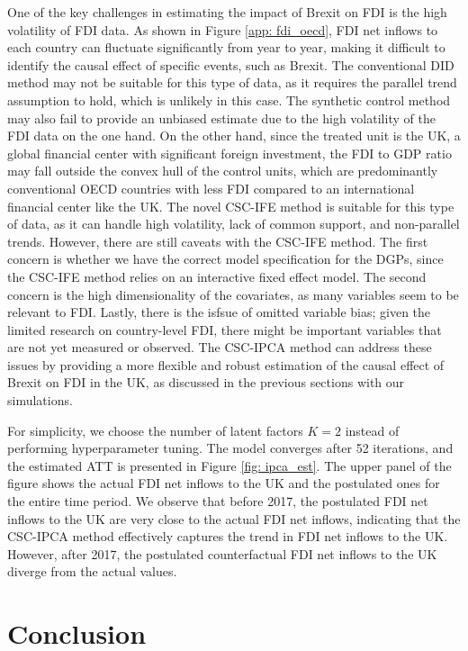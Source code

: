 \documentclass[12pt]{article}
\begin{document}
One of the key challenges in estimating the impact of Brexit on FDI is the high volatility of FDI data. As shown in Figure \ref{app: fdi_oecd}, FDI net inflows to each country can fluctuate significantly from year to year, making it difficult to identify the causal effect of specific events, such as Brexit. The conventional DID method may not be suitable for this type of data, as it requires the parallel trend assumption to hold, which is unlikely in this case. The synthetic control method may also fail to provide an unbiased estimate due to the high volatility of the FDI data on the one hand. On the other hand, since the treated unit is the UK, a global financial center with significant foreign investment, the FDI to GDP ratio may fall outside the convex hull of the control units, which are predominantly conventional OECD countries with less FDI compared to an international financial center like the UK. The novel CSC-IFE method is suitable for this type of data, as it can handle high volatility, lack of common support, and non-parallel trends. However, there are still caveats with the CSC-IFE method. The first concern is whether we have the correct model specification for the DGPs, since the CSC-IFE method relies on an interactive fixed effect model. The second concern is the high dimensionality of the covariates, as many variables seem to be relevant to FDI. Lastly, there is the isfsue of omitted variable bias; given the limited research on country-level FDI, there might be important variables that are not yet measured or observed. The CSC-IPCA method can address these issues by providing a more flexible and robust estimation of the causal effect of Brexit on FDI in the UK, as discussed in the previous sections with our simulations.

For simplicity, we choose the number of latent factors $K = 2$ instead of performing hyperparameter tuning. The model converges after 52 iterations, and the estimated ATT is presented in Figure \ref{fig: ipca_est}. The upper panel of the figure shows the actual FDI net inflows to the UK and the postulated ones for the entire time period. We observe that before 2017, the postulated FDI net inflows to the UK are very close to the actual FDI net inflows, indicating that the CSC-IPCA method effectively captures the trend in FDI net inflows to the UK. However, after 2017, the postulated counterfactual FDI net inflows to the UK diverge from the actual values. 
\section{Conclusion} 
\label{sec: conclusion}
\end{document}

